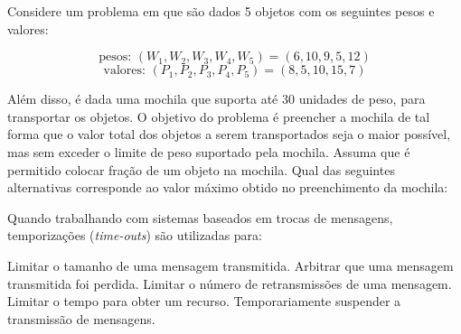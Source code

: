 \documentclass[12pt, addpoints]{exam}
\begin{document}
\begin{questions}
\question
Considere um problema em que são dados 5 objetos com os seguintes pesos e valores:

\[
\text{pesos: } (W_1, W_2, W_3, W_4, W_5) = (6, 10, 9, 5, 12)
\]
\[
\text{valores: } (P_1, P_2, P_3, P_4, P_5) = (8, 5, 10, 15, 7)
\]

Além disso, é dada uma mochila que suporta até 30 unidades de peso, para transportar os objetos. O objetivo do problema é preencher a mochila de tal forma que o valor total dos objetos a serem transportados seja o maior possível, mas sem exceder o limite de peso suportado pela mochila. Assuma que é permitido colocar fração de um objeto na mochila. Qual das seguintes alternativas corresponde ao valor máximo obtido no preenchimento da mochila:
\begin{choices}
\end{choices}

\question
Quando trabalhando com sistemas baseados em trocas de mensagens, temporizações (\textit{time-outs}) são utilizadas para:

\begin{choices}
\choice Limitar o tamanho de uma mensagem transmitida.
\choice Arbitrar que uma mensagem transmitida foi perdida.
\choice Limitar o número de retransmissões de uma mensagem.
\choice Limitar o tempo para obter um recurso.
\choice Temporariamente suspender a transmissão de mensagens.
\end{choices}



    \end{questions}
    
\end{document}
